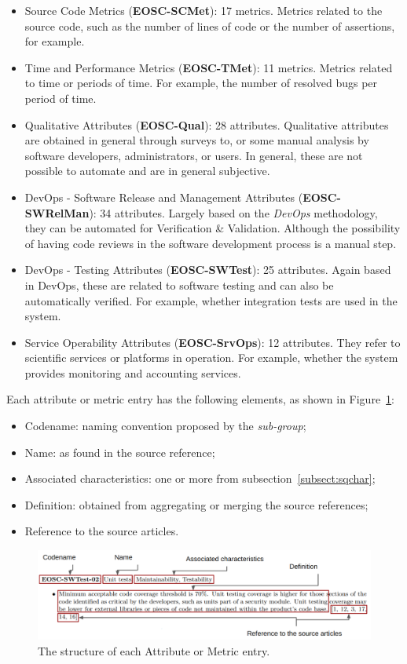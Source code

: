 \documentclass[a4paper]{article}
\begin{document}
\begin{itemize}
    \item Source Code Metrics (\textbf{EOSC-SCMet}): 17 metrics. Metrics related to the source code, such as the number of lines of code or the number of assertions, for example.

    \item Time and Performance Metrics (\textbf{EOSC-TMet}): 11 metrics. Metrics related to time or periods of time. For example, the number of resolved bugs per period of time.

    \item Qualitative Attributes (\textbf{EOSC-Qual}): 28 attributes. Qualitative attributes are obtained in general through surveys to, or some manual analysis by software developers, administrators, or users. In general, these are not possible to automate and are in general subjective.

    \item DevOps - Software Release and Management Attributes (\textbf{EOSC-SWRelMan}): 34 attributes. Largely based on the \textit{DevOps} methodology, they can be automated for Verification \& Validation. Although the possibility of having code reviews in the software development process is a manual step.

    \item DevOps - Testing Attributes (\textbf{EOSC-SWTest}): 25 attributes. Again based in DevOps, these are related to software testing and can also be automatically verified. For example, whether integration tests are used in the system.

    \item Service Operability Attributes (\textbf{EOSC-SrvOps}): 12 attributes. They refer to scientific services or platforms in operation. For example, whether the system provides monitoring and accounting services.
\end{itemize}

Each attribute or metric entry has the following elements, as shown in Figure~\ref{fig:sqattr}:

\begin{itemize}
    \item Codename: naming convention proposed by the \textit{sub-group};
    \item Name: as found in the source reference;
    \item Associated characteristics: one or more from subsection~\ref{subsect:sqchar};
    \item Definition: obtained from aggregating or merging the source references;
    \item Reference to the source articles.
\end{itemize}

\begin{figure}[h]
    \centering
    \includegraphics[width=0.9\linewidth]{../imgs/qa.png}
    \caption{The structure of each Attribute or Metric entry.}
    \label{fig:sqattr}
\end{figure}

\newpage


\newpage
\printbibliography
\end{document}
